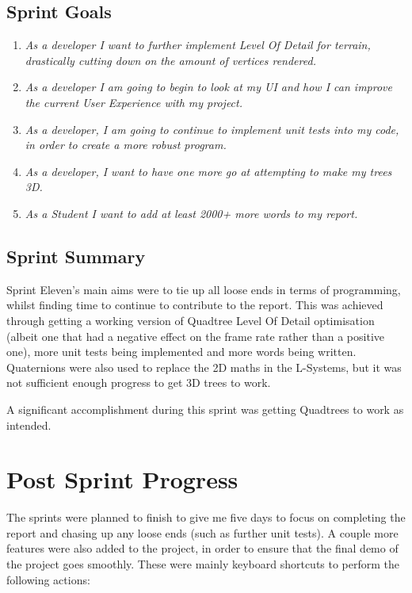 \documentclass[a4paper,10pt]{report}
\begin{document}
\subsection{Sprint Goals}
\begin{enumerate}
    \item\textit{ As a developer I want to further implement Level Of Detail for terrain, drastically cutting down on the amount of vertices rendered.}

\item\textit{ As a developer I am going to begin to look at my UI and how I can improve the current User Experience with my project.}

\item\textit{ As a developer, I am going to continue to implement unit tests into my code, in order to create a more robust program. }

\item\textit{ As a developer, I want to have one more go at attempting to make my trees 3D. }

\item\textit{ As a Student I want to add at least 2000+ more words to my report.}

\end{enumerate}

\subsection{Sprint Summary}
Sprint Eleven's main aims were to tie up all loose ends in terms of programming, whilst finding time to continue to contribute to the report. This was achieved through getting a working version of Quadtree Level Of Detail optimisation (albeit one that had a negative effect on the frame rate rather than a positive one), more unit tests being implemented and more words being written. Quaternions were also used to replace the 2D maths in the L-Systems, but it was not sufficient enough progress to get 3D trees to work. \medskip

A significant accomplishment during this sprint was getting Quadtrees to work as intended.

\section{Post Sprint Progress}
The sprints were planned to finish to give me five days to focus on completing the report and chasing up any loose ends (such as further unit tests). A couple more features were also added to the project, in order to ensure that the final demo of the project goes smoothly. These were mainly keyboard shortcuts to perform the following actions:
\end{document}
